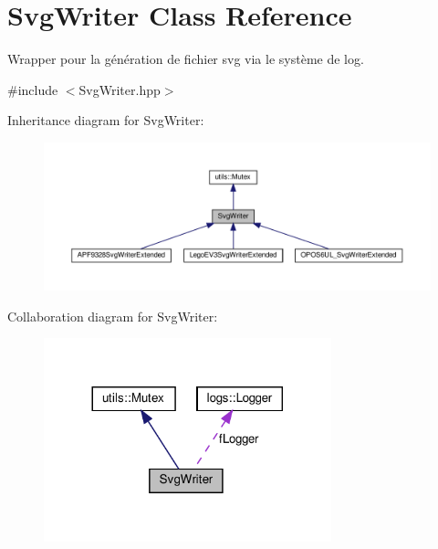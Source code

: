 \hypertarget{classSvgWriter}{}\section{Svg\+Writer Class Reference}
\label{classSvgWriter}


Wrapper pour la génération de fichier svg via le système de log.  




{\ttfamily \#include $<$Svg\+Writer.\+hpp$>$}



Inheritance diagram for Svg\+Writer\+:
\nopagebreak
\begin{figure}[H]
\begin{center}
\leavevmode
\includegraphics[width=350pt]{classSvgWriter__inherit__graph}
\end{center}
\end{figure}


Collaboration diagram for Svg\+Writer\+:
\nopagebreak
\begin{figure}[H]
\begin{center}
\leavevmode
\includegraphics[width=236pt]{classSvgWriter__coll__graph}
\end{center}
\end{figure}
